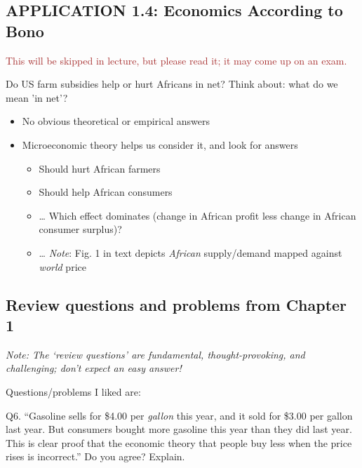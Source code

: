 \documentclass[]{article}
\providecommand{\tightlist}{%
  \setlength{\itemsep}{0pt}\setlength{\parskip}{0pt}}
\begin{document}
\hypertarget{application-1.4-economics-according-to-bono}{%
\subsection{APPLICATION 1.4: Economics According to
Bono}\label{application-1.4-economics-according-to-bono}}

\textcolor{brown}{This will be skipped in lecture, but please read it; it may come up on an exam.}

Do US farm subsidies help or hurt Africans in net?
\textcolor{RawSienna}{Think about: what do we mean 'in net'?}

\begin{itemize}
\tightlist
\item
  No obvious theoretical or empirical answers
\item
  Microeconomic theory helps us consider it, and look for answers

  \begin{itemize}
  \tightlist
  \item
    Should hurt African farmers
  \item
    Should help African consumers
  \item
    \ldots{} Which effect dominates (change in African profit less
    change in African consumer surplus)?
  \item
    \ldots{} \emph{Note}: Fig. 1 in text depicts \emph{African}
    supply/demand mapped against \emph{world} price
  \end{itemize}
\end{itemize}

\hypertarget{review-questions-and-problems-from-chapter-1}{%
\subsection{Review questions and problems from Chapter
1}\label{review-questions-and-problems-from-chapter-1}}

\emph{Note: The `review questions' are fundamental, thought-provoking,
and challenging; don't expect an easy answer!}

Questions/problems I liked are:

Q6. ``Gasoline sells for \$4.00 per \emph{gallon} this year, and it sold
for \$3.00 per gallon last year. But consumers bought more gasoline this
year than they did last year. This is clear proof that the economic
theory that people buy less when the price rises is incorrect.'' Do you
agree? Explain.
\end{document}
